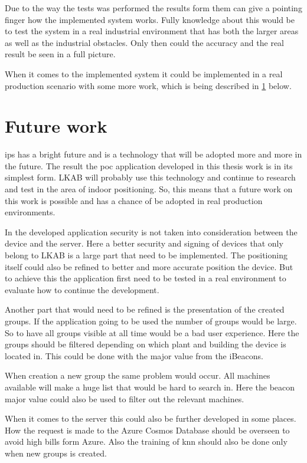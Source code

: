 Due to the way the tests was performed the results form them can give a pointing finger how the implemented system works.
Fully knowledge about this would be to test the system in a real industrial environment that has both the larger areas as well as the industrial obstacles.
Only then could the accuracy and the real result be seen in a full picture.

\bigskip

When it comes to the implemented system it could be implemented in a real production scenario with some more work, which is being described in \cref{sec:conclusionFutureWork} below.


\section{Future work}\label{sec:conclusionFutureWork}
\Acrlong{ips} has a bright future and is a technology that will be adopted more and more in the future.
The result the \acrlong{poc} application developed in this thesis work is in its simplest form.
LKAB will probably use this technology and continue to research and test in the area of indoor positioning.
So, this means that a future work on this work is possible and has a chance of be adopted in real production environments.

\bigskip

In the developed application security is not taken into consideration between the device and the server.
Here a better security and signing of devices that only belong to LKAB is a large part that need to be implemented.
The positioning itself could also be refined to better and more accurate position the device. 
But to achieve this the application first need to be tested in a real environment to evaluate how to continue the development.

\bigskip

Another part that would need to be refined is the presentation of the created groups.
If the application going to be used the number of groups would be large.
So to have all groups visible at all time would be a bad user experience.
Here the groups should be filtered depending on which plant and building the device is located in.
This could be done with the major value from the iBeacons.

\bigskip

When creation a new group the same problem would occur.
All machines available will make a huge list that would be hard to search in.
Here the beacon major value could also be used to filter out the relevant machines.

\bigskip

When it comes to the server this could also be further developed in some places.
How the request is made to the Azure Cosmos Database should be overseen to avoid high bills form Azure.
Also the training of \acrlong{knn} should also be done only when new groups is created.
